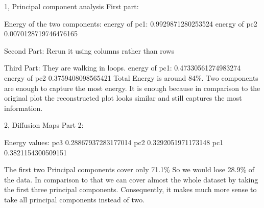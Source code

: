 \documentclass[10pt,a4paper]{article}
\begin{document}
\frontpage

\begin{task}{1, Principal component analysis}
First part: 

Energy of the two components: 
energy of pc1: 0.9929871280253524 energy of pc2 0.0070128719746476165 

Second Part: 
Rerun it using columns rather than rows 

Third Part: 
They are walking in loops. 
energy of pc1: 0.47330561274983274 energy of pc2 0.3759408098565421 
Total Energy is around 84\%. Two components are enough to capture the most energy. 
It is enough because in comparison to the original plot the reconstructed plot looks similar and still captures the most information. 
\end{task}
\begin{task}{2, Diffusion Maps}
Part 2: 

Energy values:  
pc3 0.28867937283177014  
pc2 0.3292051971173148  
pc1 0.3821154300509151 

The first two Principal components cover only 71.1\% So we would lose 28.9\% of the data.
In comparison to that we can cover almost the whole dataset by taking the first three principal components. Consequently, it makes much more sense to take all principal components instead of two. 
\end{task}
\end{document}
